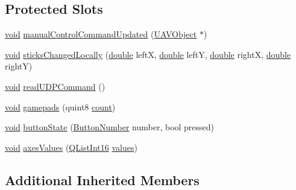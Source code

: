 \subsection*{Protected Slots}
\begin{DoxyCompactItemize}
\item 
\hyperlink{group___u_a_v_objects_plugin_ga444cf2ff3f0ecbe028adce838d373f5c}{void} \hyperlink{group___g_c_s_control_gadget_plugin_gaac625204097cbd30812c0143a80ce3ea}{manual\-Control\-Command\-Updated} (\hyperlink{class_u_a_v_object}{U\-A\-V\-Object} $\ast$)
\item 
\hyperlink{group___u_a_v_objects_plugin_ga444cf2ff3f0ecbe028adce838d373f5c}{void} \hyperlink{group___g_c_s_control_gadget_plugin_gae9a31787be607e3bf9b8b6b6a3e47983}{sticks\-Changed\-Locally} (\hyperlink{_super_l_u_support_8h_a8956b2b9f49bf918deed98379d159ca7}{double} left\-X, \hyperlink{_super_l_u_support_8h_a8956b2b9f49bf918deed98379d159ca7}{double} left\-Y, \hyperlink{_super_l_u_support_8h_a8956b2b9f49bf918deed98379d159ca7}{double} right\-X, \hyperlink{_super_l_u_support_8h_a8956b2b9f49bf918deed98379d159ca7}{double} right\-Y)
\item 
\hyperlink{group___u_a_v_objects_plugin_ga444cf2ff3f0ecbe028adce838d373f5c}{void} \hyperlink{group___g_c_s_control_gadget_plugin_ga69fe9e7fd531e69ac57247eb50f59874}{read\-U\-D\-P\-Command} ()
\item 
\hyperlink{group___u_a_v_objects_plugin_ga444cf2ff3f0ecbe028adce838d373f5c}{void} \hyperlink{group___g_c_s_control_gadget_plugin_ga1cb6abc684939d2e560ae07ca3a72cda}{gamepads} (quint8 \hyperlink{glext_8h_a5b40aca7a9682963dd00a8f5aef0a901}{count})
\item 
\hyperlink{group___u_a_v_objects_plugin_ga444cf2ff3f0ecbe028adce838d373f5c}{void} \hyperlink{group___g_c_s_control_gadget_plugin_ga515dc70507cb41b37c46ed3fd9addc47}{button\-State} (\hyperlink{sdlgamepad_8h_a2054e2a6e47649b0ab9d043afda9133f}{Button\-Number} number, bool pressed)
\item 
\hyperlink{group___u_a_v_objects_plugin_ga444cf2ff3f0ecbe028adce838d373f5c}{void} \hyperlink{group___g_c_s_control_gadget_plugin_ga575f8651147d4a9a96a360d3ac4c600f}{axes\-Values} (\hyperlink{sdlgamepad_8h_a0cff90f48b1cb30ecb36bbfea594b50b}{Q\-List\-Int16} \hyperlink{glext_8h_a300a8ed5fb9490aa35713406ec0412df}{values})
\end{DoxyCompactItemize}
\subsection*{Additional Inherited Members}


